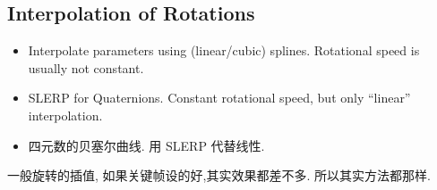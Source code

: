 \subsection{Interpolation of Rotations}
\begin{itemize}
    \item Interpolate parameters using (linear/cubic) splines. Rotational speed is usually not constant. 
    \item SLERP for Quaternions. Constant rotational speed, but only ``linear'' interpolation. 
    \item 四元数的贝塞尔曲线. 用 SLERP 代替线性.
\end{itemize}

一般旋转的插值, 如果关键帧设的好,其实效果都差不多. 所以其实方法都那样. 


